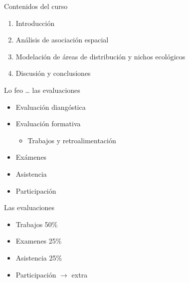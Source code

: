 \documentclass[
  11pt,
  ignorenonframetext,
]{beamer}
\providecommand{\tightlist}{%
  \setlength{\itemsep}{0pt}\setlength{\parskip}{0pt}}
\begin{document}
\begin{frame}{Contenidos del curso}
\protect\hypertarget{contenidos-del-curso}{}
\begin{enumerate}
\tightlist
\item
  Introducción
\item
  Análisis de asociación espacial
\item
  Modelación de áreas de distribución y nichos ecológicos
\item
  Discusión y conclusiones
\end{enumerate}
\end{frame}

\begin{frame}{Lo feo \ldots{} las evaluaciones}
\protect\hypertarget{lo-feo-las-evaluaciones}{}
\begin{itemize}
\item
  Evaluación diangóstica
\item
  Evaluación formativa

  \begin{itemize}
  \tightlist
  \item
    Trabajos y retroalimentación
  \end{itemize}
\item
  Exámenes
\item
  Asistencia
\item
  Participación
\end{itemize}
\end{frame}

\begin{frame}{Las evaluaciones}
\protect\hypertarget{las-evaluaciones}{}
\begin{itemize}
\tightlist
\item
  Trabajos 50\%
\item
  Examenes 25\%
\item
  Asistencia 25\%
\item
  Participación \(\rightarrow\) extra
\end{itemize}
\end{frame}
\end{document}
